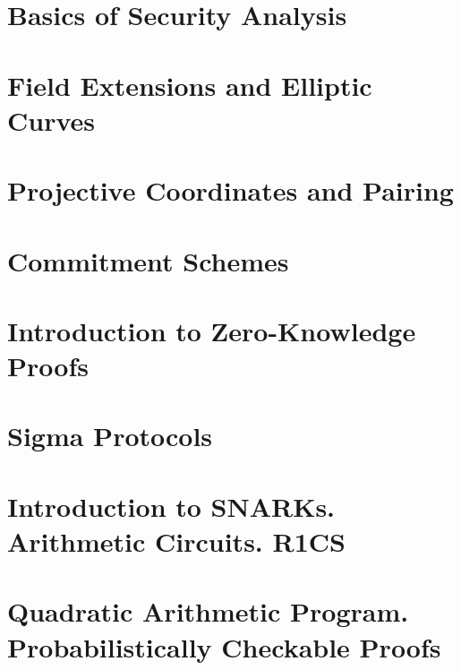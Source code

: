 \documentclass{zkdl-template-105x135-nohead}
\begin{document}
    \section{Basics of Security Analysis}\label{section:math-crypto-2}

    

    \section{Field Extensions and Elliptic Curves}

    \label{section:field_extensions}

    \section{Projective Coordinates and Pairing}

    

    \section{Commitment Schemes} \label{section:commitments}

     

    \section{Introduction to Zero-Knowledge Proofs} \label{section:intro-zk}

    

    \section{Sigma Protocols} \label{section:sigma}

    

    \section[Arithmetic Circuits. R1CS]{Introduction to SNARKs. Arithmetic Circuits. R1CS} \label{section:r1cs}

    \label{secation:circuits}

    \section[Quadratic Arithmetic Program]{Quadratic Arithmetic Program. Probabilistically Checkable Proofs} \label{section:qap}
\end{document}
